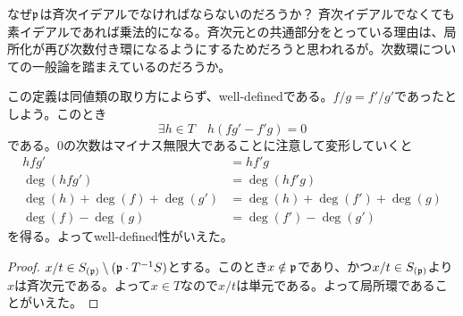 \begin{rem}
  なぜ$\mathfrak{p}$は斉次イデアルでなければならないのだろうか？ 斉次イデアルでなくても素イデアルであれば乗法的になる。斉次元との共通部分をとっている理由は、局所化が再び次数付き環になるようにするためだろうと思われるが。次数環についての一般論を踏まえているのだろうか。
\end{rem}



\begin{rem}
  この定義は同値類の取り方によらず、well-definedである。$f/g=f'/g'$であったとしよう。このとき
  \[
  \exists h \in T \quad h(fg' - f'g) = 0
  \]
  である。$0$の次数はマイナス無限大であることに注意して変形していくと
  \begin{align*}
    hfg' &= hf'g \\
    \deg(hfg') &= \deg(hf'g) \\
    \deg(h) + \deg(f) + \deg(g') &= \deg(h) + \deg(f') + \deg(g) \\
    \deg(f) - \deg(g) &= \deg(f') - \deg(g')
  \end{align*}
  を得る。よってwell-defined性がいえた。
\end{rem}



\begin{proof}
  $x/t \in S_{(\mathfrak{p})} \setminus (\mathfrak{p} \cdot T^{-1}S)$とする。このとき$x \notin \mathfrak{p}$であり、かつ$x/t \in S_{(\mathfrak{p})}$より$x$は斉次元である。よって$x \in T$なので$x/t$は単元である。よって局所環であることがいえた。
\end{proof}



